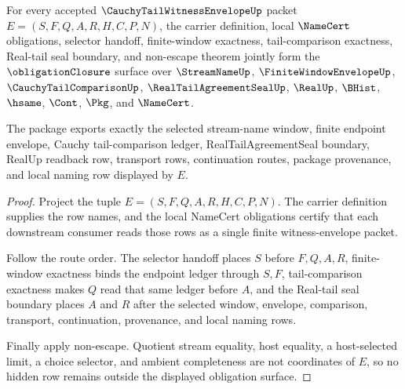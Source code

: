 \begin{theorem}
\label{thm:cauchy-tail-witness-envelope-obligation-closure}
For every accepted $\CauchyTailWitnessEnvelopeUp$ packet $E=(S,F,Q,A,R,H,C,P,N)$, the carrier definition, local $\NameCert$ obligations, selector handoff, finite-window exactness, tail-comparison exactness, Real-tail seal boundary, and non-escape theorem jointly form the $\obligationClosure$ surface over $\StreamNameUp$, $\FiniteWindowEnvelopeUp$, $\CauchyTailComparisonUp$, $\RealTailAgreementSealUp$, $\RealUp$, $\BHist$, $\hsame$, $\Cont$, $\Pkg$, and $\NameCert$.

The package exports exactly the selected stream-name window, finite endpoint envelope, Cauchy tail-comparison ledger, RealTailAgreementSeal boundary, RealUp readback row, transport rows, continuation routes, package provenance, and local naming row displayed by $E$.
\end{theorem}
\begin{proof}
Project the tuple $E=(S,F,Q,A,R,H,C,P,N)$. The carrier definition supplies the row names, and the local NameCert obligations certify that each downstream consumer reads those rows as a single finite witness-envelope packet.

Follow the route order. The selector handoff places $S$ before $F,Q,A,R$, finite-window exactness binds the endpoint ledger through $S,F$, tail-comparison exactness makes $Q$ read that same ledger before $A$, and the Real-tail seal boundary places $A$ and $R$ after the selected window, envelope, comparison, transport, continuation, provenance, and local naming rows.

Finally apply non-escape. Quotient stream equality, host equality, a host-selected limit, a choice selector, and ambient completeness are not coordinates of $E$, so no hidden row remains outside the displayed obligation surface.
\end{proof}

